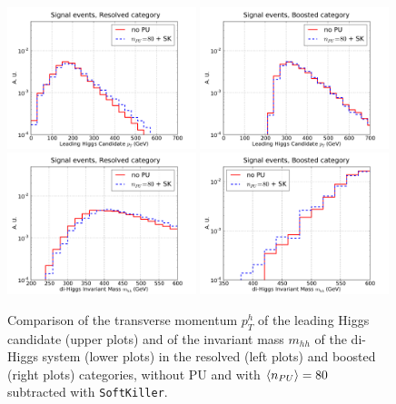 \begin{figure}[t]
  \begin{center}
  \includegraphics[width=0.49\textwidth]{plots/pt_H0_C2_res_comp.pdf}
  \includegraphics[width=0.49\textwidth]{plots/pt_H0_C2_bst_comp.pdf}
  \includegraphics[width=0.49\textwidth]{plots/m_HH_C2_res_comp.pdf}
  \includegraphics[width=0.49\textwidth]{plots/m_HH_C2_bst_comp.pdf}
  \caption{\small
    Comparison of the transverse momentum $p_T^h$ of the leading
    Higgs candidate (upper plots) and of the invariant mass $m_{hh}$
    of the di-Higgs system (lower plots) in the resolved
    (left plots) and boosted (right plots) categories,
    without PU and with $\left\langle n_{PU}\right\rangle=80$ subtracted with {\tt SoftKiller}.
}
\label{fig:mHH_PU}
\end{center}
\end{figure}

